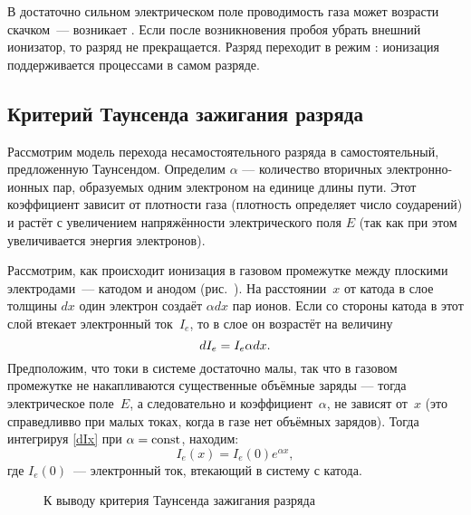 В достаточно сильном электрическом поле проводимость газа может возрасти
скачком~--- возникает .
Если после возникновения пробоя убрать внешний ионизатор, то разряд не
прекращается. Разряд переходит в режим :
ионизация поддерживается процессами в самом разряде.

\subsection*{Критерий Таунсенда зажигания разряда}
Рассмотрим модель перехода несамостоятельного разряда в самостоятельный,
предложенную Таунсендом.
Определим  $\alpha$ ---
количество вторичных электронно-ионных пар, образуемых одним электроном
на единице длины пути.
Этот коэффициент зависит от плотности газа
(плотность определяет число соударений)
и растёт с увеличением напряжённости электрического поля $E$
(так как при этом увеличивается энергия электронов).

Рассмотрим, как происходит ионизация в газовом промежутке между плоскими
электродами~--- катодом и анодом (рис.~). На
расстоянии~$x$ от катода в слое толщины $dx$ один электрон создаёт $\alpha dx$
пар ионов. Если со стороны катода в этот
слой втекает электронный ток~$I_e$, то в слое он возрастёт на величину
\begin{equation}
\eqmark{dIx}
dI_e=I_e\alpha dx.
\end{equation}
Предположим, что токи в системе достаточно малы, так что в газовом промежутке
не накапливаются существенные объёмные заряды --- тогда электрическое поле~$E$,
а следовательно и коэффициент~$\alpha$, не зависят от~$x$
(это справедливво при малых токах, когда в газе нет объёмных зарядов).
Тогда интегрируя \eqref{dIx} при $\alpha=\mathrm{const}$, находим:
\begin{equation*}
	I_e(x)=I_e(0)e^{\alpha x},
\end{equation*}
где $I_e(0)$~--- электронный ток, втекающий в систему с катода.

\begin{wrapfigure}{o}{0.3\textwidth}
    \centering
    \caption{К выводу критерия Таунсенда зажигания разряда}
\end{wrapfigure}

